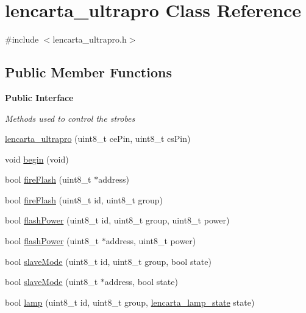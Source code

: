 \hypertarget{classlencarta__ultrapro}{\section{lencarta\+\_\+ultrapro Class Reference}
\label{classlencarta__ultrapro}
}


{\ttfamily \#include $<$lencarta\+\_\+ultrapro.\+h$>$}

\subsection*{Public Member Functions}
\begin{Indent}{\bf Public Interface}\par
{\em Methods used to control the strobes }\begin{DoxyCompactItemize}
\item 
\hyperlink{classlencarta__ultrapro_a050ac8d7f5d956b69d6b660da2ce689a}{lencarta\+\_\+ultrapro} (uint8\+\_\+t ce\+Pin, uint8\+\_\+t cs\+Pin)
\item 
void \hyperlink{classlencarta__ultrapro_ae146781ab2b30b7bdc5756077fdfb56e}{begin} (void)
\item 
bool \hyperlink{classlencarta__ultrapro_a10aa8bb22fd884847084f11e83180c90}{fire\+Flash} (uint8\+\_\+t $\ast$address)
\item 
bool \hyperlink{classlencarta__ultrapro_a3d9cd4ed1024dbdeddea82bbd918cf66}{fire\+Flash} (uint8\+\_\+t id, uint8\+\_\+t group)
\item 
bool \hyperlink{classlencarta__ultrapro_a7353e83a0fde358a5e6c2317b7c81f13}{flash\+Power} (uint8\+\_\+t id, uint8\+\_\+t group, uint8\+\_\+t power)
\item 
bool \hyperlink{classlencarta__ultrapro_a3133db3a1e30ce98c9a6b2c9761f35ec}{flash\+Power} (uint8\+\_\+t $\ast$address, uint8\+\_\+t power)
\item 
bool \hyperlink{classlencarta__ultrapro_a9f43977874a5ec6ca55a7722aeda10fd}{slave\+Mode} (uint8\+\_\+t id, uint8\+\_\+t group, bool state)
\item 
bool \hyperlink{classlencarta__ultrapro_ab21ac7822bd1a878c700ec2941d8ead6}{slave\+Mode} (uint8\+\_\+t $\ast$address, bool state)
\item 
bool \hyperlink{classlencarta__ultrapro_a76e63a1f419892a2bd6fbb2c7560d7ec}{lamp} (uint8\+\_\+t id, uint8\+\_\+t group, \hyperlink{lencarta__ultrapro_8h_a41957b2109dd20ef9e0ac0820e9034cc}{lencarta\+\_\+lamp\+\_\+state} state)
\item 

\end{DoxyCompactItemize}
\end{Indent}
